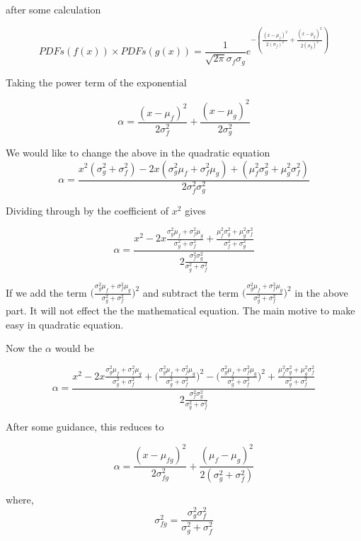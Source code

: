 after some calculation

\begin{equation}
      PDFs(f(x)) \times PDFs(g(x)) = \frac{1}{\sqrt{2\pi}\sigma_f \sigma_g} {e^{-( \frac{{(x-\mu _f)}^2}{2{(\sigma_f)}^2} + \frac{{(x-\mu _g)}^2}{2{(\sigma_g)}^2})}}
\end{equation}
     
Taking the power term of the exponential  

$$\alpha = \frac{(x-\mu_f)^2}{2\sigma_f^2} + \frac{(x-\mu_g)^2}{2\sigma_g^2} $$

We would like to change the above in the quadratic equation
$$\alpha = \frac{x^2(\sigma_g^2 + \sigma_f^2) -2x(\sigma_g^2\mu_f+\sigma_f^2\mu_g) + (\mu_f^2\sigma_g^2 + \mu_g^2\sigma_f^2) }{2\sigma_f^2\sigma_g^2} $$

Dividing through by the coefficient of $x^2$ gives

\begin{equation}
 \alpha =  \frac{x^2 - 2x\frac{\sigma_g^2\mu_f+\sigma_f^2\mu_g}{\sigma_g^2+\sigma_f^2} + \frac{\mu_f^2\sigma_g^2 + \mu_g^2\sigma_f^2}{\sigma_f^2 + \sigma_g^2}}{2 \frac{\sigma_f^2\sigma_g^2}{\sigma_g^2 + \sigma_f^2}}  
\end{equation}


 If we add the term $\Bigg(\frac{\sigma_g^2\mu_f+\sigma_f^2\mu_g}{\sigma_g^2+\sigma_f^2}\Bigg)^2$ and subtract the term $\Bigg(\frac{\sigma_g^2\mu_f+\sigma_f^2\mu_g}{\sigma_g^2+\sigma_f^2}\Bigg)^2$ in the above part. It will not effect the the mathematical equation. The main motive to make easy in quadratic equation. \hfill
 
 Now the $\alpha$ would be
 
 $$\alpha = \frac{x^2 - 2x\frac{\sigma_g^2\mu_f+\sigma_f^2\mu_g}{\sigma_g^2+\sigma_f^2} + \Bigg(\frac{\sigma_g^2\mu_f+\sigma_f^2\mu_g}{\sigma_g^2+\sigma_f^2}\Bigg)^2 - \Bigg(\frac{\sigma_g^2\mu_f+\sigma_f^2\mu_g}{\sigma_g^2+\sigma_f^2}\Bigg)^2  +\frac{\mu_f^2\sigma_g^2 + \mu_g^2\sigma_f^2}{\sigma_g^2 + \sigma_f^2}}{2 \frac{\sigma_f^2\sigma_g^2}{\sigma_g^2+\sigma_f^2}} $$
 
 After some guidance, this reduces to 
 
 
\begin{equation}
    \alpha = \frac{(x-\mu_{fg})^2}{2\sigma_{fg}^2} + \frac{(\mu_f - \mu_g)^2}{2(\sigma_g^2 + \sigma_f^2)}
\end{equation}

where, 
$$\sigma_{fg}^2 = \frac{\sigma_g^2 \sigma_f^2}{\sigma_g^2 + \sigma_f^2}$$


